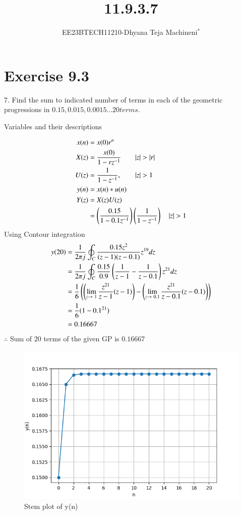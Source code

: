 \documentclass[journal,12pt,twocolumn]{IEEEtran}
\theoremstyle{remark}
\begin{document}

\vspace{3cm}
\title{\textbf{11.9.3.7}}
\author{EE23BTECH11210-Dhyana Teja Machineni$^{*}$%
}
\maketitle
\newpage
\bigskip

\section*{Exercise 9.3}
7. \hspace{2pt}Find the sum to indicated number of terms in each of the geometric progressions in
$0.15, 0.015, 0.0015\ldots 20 terms$.

\solution
     \begin{table}[h]
         \label{tab:table2}
         \caption{Variables and their descriptions}
         
     \end{table}
\begin{align}
x(n) &= x(0)r^n \\
X(z) &= \frac{x(0)}{1-rz^{-1}} \qquad |z| > |r| \\
U(z)&=\frac{1}{1-z^{-1}}, \qquad |z|>1\\
y(n)&= x(n)*u(n)\\
Y(z)&=X(z)U(z)\\
&=\brak{ \frac{0.15}{1-0.1z^{-1}}}\brak{\frac{1}{1-z^{-1}}}\quad|z| > 1
\end{align}
Using Contour integration
\begin{align}
y(20)&=\frac{1}{2\pi j}\oint_C \frac{0.15 z^2}{(z-1)(z-0.1)}z^{19} dz\\
&=\frac{1}{2 \pi j}\oint_C \frac{0.15}{0.9} \left(\frac{1}{z-1} - \frac{1}{z-0.1}\right)z^{21}dz\\
&= \frac{1}{6} \left(\left(\lim_{z\to \ 1}\frac{z^{21}}{z-1} (z-1)\right)-\left(\lim_{z \to \ 0.1}\frac{z^{21}}{z-0.1} (z-0.1)\right)\right)\\
&= \frac{1}{6}(1- 0.1^{21})\\
    &=0.16667
\end{align}
        $\therefore$ Sum of $20$ terms of the given GP is $0.16667$
       \renewcommand{\thefigure}{\theenumi}
 \renewcommand{\thetable}{\theenumi}
\begin{figure}[h]
  
  \includegraphics[width=\columnwidth]{figs/graph.png}
  \caption{Stem plot of y(n)}
  \label{fig:your_label}
\end{figure}
\end{document}
